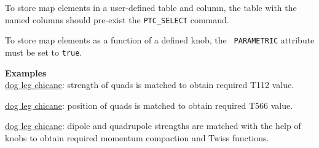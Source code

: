 To store map elements in a user-defined table and column, the table with the
named columns should pre-exist the {\tt PTC\_SELECT} command.

To store map elements as a function of a defined knob, the {\tt
  PARAMETRIC} attribute must be set to {\tt true}.


{\bf Examples}\\

\href{http://cern.ch/frs/mad-X_examples/ptc_madx_interface/ptc_secordmatch/chicane.madx}{dog
  leg chicane}: strength of quads is matched to obtain required T112
value.    

\href{http://cern.ch/frs/mad-X_examples/ptc_madx_interface/eplacement/chicane.madx}{dog
  leg chicane}: position of quads is matched to obtain required T566
value.   

\href{http://cern.ch/frs/mad-X_examples/ptc_madx_interface/matchwithknobs/matchwithknobs.madx}{dog
  leg chicane}: dipole and quadrupole strengths are matched with the
help of knobs to obtain required momentum compaction and Twiss
functions.   








